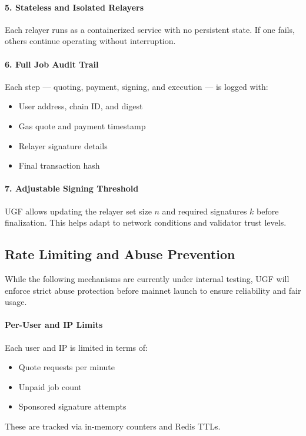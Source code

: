 \documentclass{article}
\begin{document}
\paragraph{5. Stateless and Isolated Relayers}
Each relayer runs as a containerized service with no persistent state. If one fails, others continue operating without interruption.

\paragraph{6. Full Job Audit Trail}
Each step — quoting, payment, signing, and execution — is logged with:
\begin{itemize}
  \item User address, chain ID, and digest
  \item Gas quote and payment timestamp
  \item Relayer signature details
  \item Final transaction hash
\end{itemize}

\paragraph{7. Adjustable Signing Threshold}
UGF allows updating the relayer set size \( n \) and required signatures \( k \) before finalization. This helps adapt to network conditions and validator trust levels.

\subsection{Rate Limiting and Abuse Prevention}

While the following mechanisms are currently under internal testing, UGF will enforce strict abuse protection before mainnet launch to ensure reliability and fair usage.

\paragraph{Per-User and IP Limits}
Each user and IP is limited in terms of:
\begin{itemize}
  \item Quote requests per minute
  \item Unpaid job count
  \item Sponsored signature attempts
\end{itemize}
These are tracked via in-memory counters and Redis TTLs.
\end{document}
